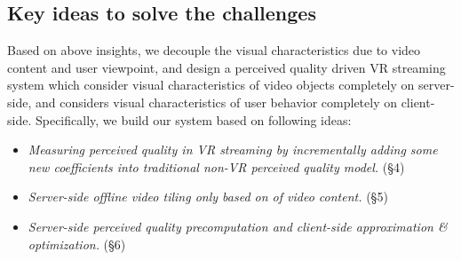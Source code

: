 \subsection{Key ideas to solve the challenges}

Based on above insights, we decouple the visual characteristics due to video content and user viewpoint, and design a perceived quality driven VR streaming system which consider visual characteristics of video objects completely on server-side, and considers visual characteristics of user behavior completely on client-side. Specifically, we build our system based on following ideas:

\begin{itemize}

\item \emph{Measuring perceived quality in VR streaming by incrementally adding some new coefficients into traditional non-VR perceived quality model.} (\S 4)

\item \emph{Server-side offline video tiling only based on of video content.} (\S 5)

\item \emph{Server-side perceived quality precomputation and client-side approximation \& optimization.} (\S 6)

\end{itemize}
